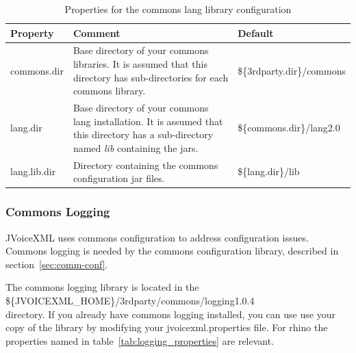\documentclass[11pt,a4paper]{article}
\begin{document}
\begin{table}[h]
\caption{Properties for the commons lang library configuration}
\label{tab:lang_properties}

\begin{center}

\begin{tabular}{|l|p{4cm}|l|}
\hline
\textbf{Property} & \textbf{Comment} & \textbf{Default} \\
\hline
\hline
commons.dir & 
Base directory of your commons libraries. It is assumed
that this directory has sub-directories for each
commons library.
& \$\{3rdparty.dir\}/commons \\
\hline
lang.dir & 
Base directory of your commons lang installation.
It is assumed that this directory
has a sub-directory named \emph{lib} containing the jars.
& \$\{commons.dir\}/lang2.0 \\
\hline
lang.lib.dir & 
Directory containing the commons configuration jar files.
& \$\{lang.dir\}/lib \\
\hline
\end{tabular}

\end{center}

\end{table}

\subsubsection{Commons Logging}
\label{sec:commons-lang}

JVoiceXML uses commons configuration to address configuration
issues. Commons logging is needed by the commons configuration library,
described in section~\ref{sec:comm-conf}.

The commons logging library is located in the \\
\$\{JVOICEXML\_HOME\}/3rdparty/commons/logging1.0.4 \\
directory. If you already have commons logging installed, you can use
use your copy of the library by modifying your jvoicexml.properties file.
For rhino the properties named in table~\ref{tab:logging_properties} are 
relevant.
\end{document}
